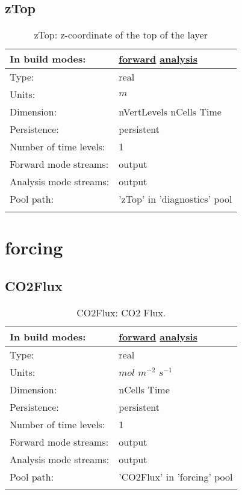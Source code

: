 \subsection[zTop]{zTop}
\label{subsec:var_sec_diagnostics_zTop}
\begin{center}
\begin{longtable}{| p{2.0in} | p{4.0in} |}
        \hline 
        In build modes: & \hyperref[subsec:forward_var_tab_diagnostics]{forward} \hyperref[subsec:analysis_var_tab_diagnostics]{analysis} \\
        \hline 
        Type: & real \\
        \hline 
        Units: & $m$ \\
        \hline 
        Dimension: & nVertLevels nCells Time \\
        \hline 
        Persistence: & persistent \\
        \hline 
        Number of time levels: & 1 \\
        \hline 
		 Forward mode streams: &  output \\
        \hline 
		 Analysis mode streams: &  output \\
        \hline 
            Pool path: & 'zTop' in 'diagnostics' pool
 \\
		 \hline 
    \caption{zTop: z-coordinate of the top of the layer}
\end{longtable}
\end{center}
\section[forcing]{forcing}
\label{sec:var_sec_forcing}
\subsection[CO2Flux]{CO2Flux}
\label{subsec:var_sec_forcing_CO2Flux}
\begin{center}
\begin{longtable}{| p{2.0in} | p{4.0in} |}
        \hline 
        In build modes: & \hyperref[subsec:forward_var_tab_forcing]{forward} \hyperref[subsec:analysis_var_tab_forcing]{analysis} \\
        \hline 
        Type: & real \\
        \hline 
        Units: & $mol$ $m^{-2}$ $s^{-1}$ \\
        \hline 
        Dimension: & nCells Time \\
        \hline 
        Persistence: & persistent \\
        \hline 
        Number of time levels: & 1 \\
        \hline 
		 Forward mode streams: &  output \\
        \hline 
		 Analysis mode streams: &  output \\
        \hline 
            Pool path: & 'CO2Flux' in 'forcing' pool
 \\
		 \hline 
    \caption{CO2Flux: CO2 Flux.}
\end{longtable}
\end{center}
